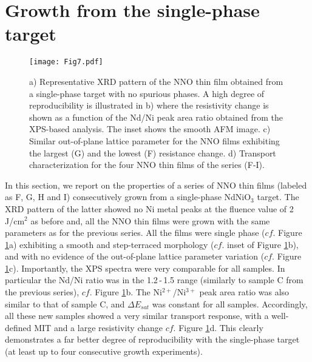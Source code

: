 \documentclass[aip,graphicx,numerical]{revtex4-1}
\begin{document}
\section{Growth from the single-phase target}
\begin{figure}
  \texttt{[image: Fig7.pdf]}
  \caption{a) Representative XRD pattern of the NNO thin film obtained from a single-phase target with no spurious phases. A high degree of reproducibility is illustrated in b) where the resistivity change is shown as a function of the Nd/Ni peak area ratio obtained from the XPS-based analysis. The inset shows the smooth AFM image. c) Similar out-of-plane lattice parameter for the NNO films exhibiting the largest (G) and the lowest (F) resistance change. d) Transport characterization for the four NNO thin films of the series (F-I). 
  \label{fig7}}
\end{figure}
In this section, we report on the properties of a series of NNO thin films (labeled as F, G, H and I) consecutively grown from a single-phase NdNiO$_3$ target. The XRD pattern of the latter showed no Ni metal peaks at the fluence value of 2\,J/cm$^2$ as before and, all the NNO thin films were grown with the same parameters as for the previous series. All the films were single phase ($cf.$ Figure \ref{fig7}a) exhibiting a smooth and step-terraced morphology ($cf.$ inset of Figure \ref{fig7}b), and with no evidence of the out-of-plane lattice parameter variation ($cf.$ Figure \ref{fig7}c). Importantly, the XPS spectra were very comparable for all samples. In particular the Nd/Ni ratio was in the 1.2\,-\,1.5 range (similarly to sample C from the previous series), $cf.$ Figure \ref{fig7}b. The Ni$^{2+}$/Ni$^{3+}$ peak area ratio was also similar to that of sample C, and $\Delta E_{sat}$ was constant for all samples. Accordingly, all these new samples showed a very similar transport response, with a well-defined MIT and a large resistivity change $cf.$ Figure \ref{fig7}d. This clearly demonstrates a far better degree of reproducibility with the single-phase target (at least up to four consecutive growth experiments).
\end{document}
